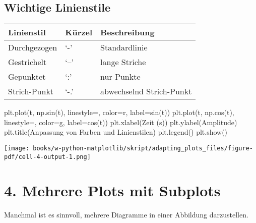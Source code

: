 \documentclass[
  letterpaper,
  DIV=11,
  numbers=noendperiod]{scrreprt}
\newenvironment{Shaded}{\begin{snugshade}}{\end{snugshade}}
\newcommand{\NormalTok}[1]{\textcolor[rgb]{0.00,0.23,0.31}{#1}}
\newcommand{\OperatorTok}[1]{\textcolor[rgb]{0.37,0.37,0.37}{#1}}
\newcommand{\StringTok}[1]{\textcolor[rgb]{0.13,0.47,0.30}{#1}}
\begin{document}
\begin{tcolorbox}
\subsection{Wichtige Linienstile}\label{wichtige-linienstile}

\begin{longtable}[]{@{}lll@{}}
\toprule\noalign{}
Linienstil & Kürzel & Beschreibung \\
\midrule\noalign{}
\endhead
\bottomrule\noalign{}
\endlastfoot
Durchgezogen & `-' & Standardlinie \\
Gestrichelt & `--' & lange Striche \\
Gepunktet & `:' & nur Punkte \\
Strich-Punkt & `-.' & abwechselnd Strich-Punkt \\
\end{longtable}

\begin{Shaded}
\begin{Highlighting}[]
\NormalTok{plt.plot(t, np.sin(t), linestyle}\OperatorTok{=}\StringTok{\textquotesingle{}{-}\textquotesingle{}}\NormalTok{, color}\OperatorTok{=}\StringTok{\textquotesingle{}r\textquotesingle{}}\NormalTok{, label}\OperatorTok{=}\StringTok{\textquotesingle{}sin(t)\textquotesingle{}}\NormalTok{)}
\NormalTok{plt.plot(t, np.cos(t), linestyle}\OperatorTok{=}\StringTok{\textquotesingle{}{-}{-}\textquotesingle{}}\NormalTok{, color}\OperatorTok{=}\StringTok{\textquotesingle{}g\textquotesingle{}}\NormalTok{, label}\OperatorTok{=}\StringTok{\textquotesingle{}cos(t)\textquotesingle{}}\NormalTok{)}
\NormalTok{plt.xlabel(}\StringTok{\textquotesingle{}Zeit (s)\textquotesingle{}}\NormalTok{)}
\NormalTok{plt.ylabel(}\StringTok{\textquotesingle{}Amplitude\textquotesingle{}}\NormalTok{)}
\NormalTok{plt.title(}\StringTok{\textquotesingle{}Anpassung von Farben und Linienstilen\textquotesingle{}}\NormalTok{)}
\NormalTok{plt.legend()}
\NormalTok{plt.show()}
\end{Highlighting}
\end{Shaded}

\texttt{[image: books/w-python-matplotlib/skript/adapting\_plots\_files/figure-pdf/cell-4-output-1.png]}

\section{4. Mehrere Plots mit
Subplots}\label{mehrere-plots-mit-subplots}

Manchmal ist es sinnvoll, mehrere Diagramme in einer Abbildung
darzustellen.


\end{tcolorbox}
\end{document}
